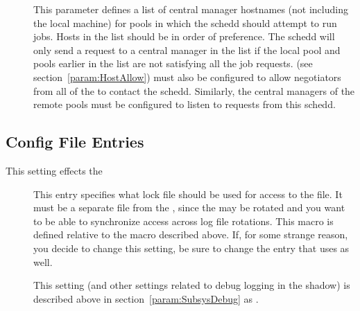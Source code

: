 \begin{description}
\item[] \label{param:FlockHosts} This parameter
  defines a list of central manager hostnames (not including the local
   machine) for pools in which the schedd should
  attempt to run jobs.  Hosts in the list should be in order of
  preference.  The schedd will only send a request to a central
  manager in the list if the local pool and pools earlier in the list
  are not satisfying all the job requests.
   (see
  section~\ref{param:HostAllow}) must also be configured to allow
  negotiators from all of the  to contact the
  schedd.  Similarly, the central managers of the remote pools must be
  configured to listen to requests from this schedd.

\end{description}

\subsection{\label{sec:Shadow-Config-File-Entries}
 Config File Entries}

This setting effects the 
\begin{description}

\item[] \label{param:ShadowLock} This entry
  specifies what lock file should be used for access to the
   file.  It must be a separate file from the
  , since the  may be rotated and you
  want to be able to synchronize access across log file rotations.
  This macro is defined relative to the  macro described
  above.  If, for some strange reason, you decide to change this
  setting, be sure to change the  entry that
   uses as well.

\item[] \label{param:ShadowDebug} This setting
  (and other settings related to debug logging in the shadow) is
  described above in section~\ref{param:SubsysDebug} as
  .

\end{description}

